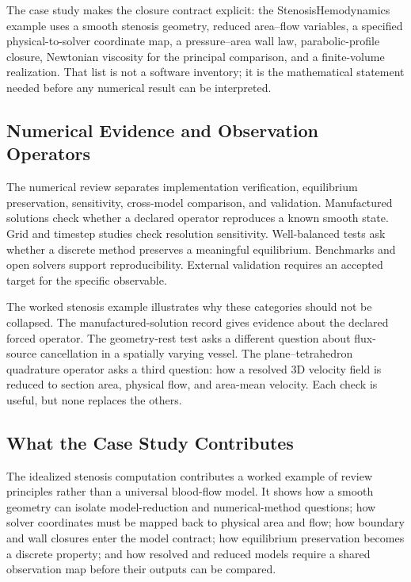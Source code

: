 The case study makes the closure contract explicit: the StenosisHemodynamics
example uses a smooth stenosis geometry, reduced area--flow variables, a
specified physical-to-solver coordinate map, a pressure--area wall law,
parabolic-profile closure, Newtonian viscosity for the principal comparison,
and a finite-volume realization. That list is not a software inventory; it is
the mathematical statement needed before any numerical result can be interpreted.

\subsection{Numerical Evidence and Observation Operators}
\label{subsec:discussion-numerical-evidence-observation}

The numerical review separates implementation verification, equilibrium
preservation, sensitivity, cross-model comparison, and validation. Manufactured
solutions check whether a declared operator reproduces a known smooth state.
Grid and timestep studies check resolution sensitivity. Well-balanced tests ask
whether a discrete method preserves a meaningful equilibrium. Benchmarks and
open solvers support reproducibility. External validation requires an accepted
target for the specific observable.

The worked stenosis example illustrates why these categories should not be
collapsed. The manufactured-solution record gives evidence about the declared
forced operator. The geometry-rest test asks a different question about
flux-source cancellation in a spatially varying vessel. The plane--tetrahedron
quadrature operator asks a third question: how a resolved 3D velocity field is
reduced to section area, physical flow, and area-mean velocity. Each check is
useful, but none replaces the others.

\subsection{What the Case Study Contributes}
\label{subsec:discussion-case-study-contribution}

The idealized stenosis computation contributes a worked example of review
principles rather than a universal blood-flow model. It shows how a smooth
geometry can isolate model-reduction and numerical-method questions; how solver
coordinates must be mapped back to physical area and flow; how boundary and wall
closures enter the model contract; how equilibrium preservation becomes a
discrete property; and how resolved and reduced models require a shared
observation map before their outputs can be compared.

